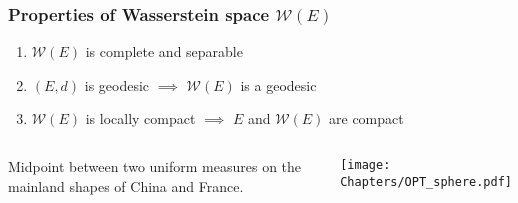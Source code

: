 \documentclass[aspectratio=169]{beamer}
\begin{document}
\begin{frame}
	\frametitle{Properties of Wasserstein space $\mathcal{W}(E)$}
	\begin{enumerate}
		\item<1> $\mathcal{W}(E)$ is complete and separable\\[0.2cm]
		\item $(E,d)$ is geodesic $\implies$ $\mathcal{W}(E)$ is a geodesic\\[0.2cm]
		      \item<1> $\mathcal{W}(E)$ is locally compact $\implies$ $E$ and $\mathcal{W}(E)$ are compact
	\end{enumerate}
	\pause
	\begin{columns}
		\begin{example}
			Midpoint between two uniform measures on
			the mainland shapes of China and France.
		\end{example}
		\begin{center}
			\texttt{[image: Chapters/OPT\_sphere.pdf]}
		\end{center}
	\end{columns}
\end{frame}
\end{document}
